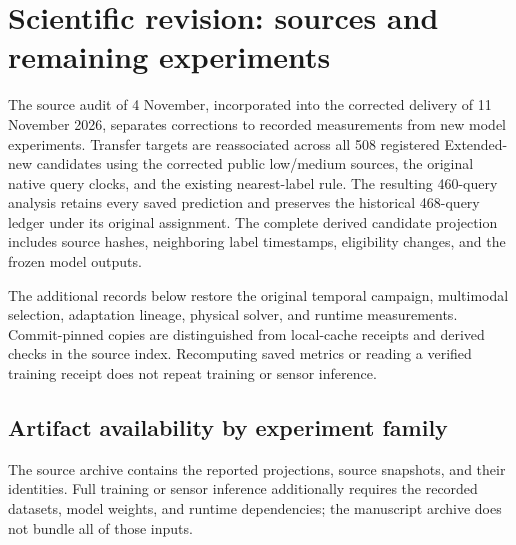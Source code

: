 \clearpage
\section{Scientific revision: sources and remaining experiments}
\label{app:scientific-revision}

The source audit of 4 November, incorporated into the corrected delivery of 11 November 2026, separates corrections to recorded measurements from new model experiments. Transfer targets are reassociated across all 508 registered Extended-new candidates using the corrected public low/medium sources, the original native query clocks, and the existing nearest-label rule. The resulting 460-query analysis retains every saved prediction and preserves the historical 468-query ledger under its original assignment. The complete derived candidate projection includes source hashes, neighboring label timestamps, eligibility changes, and the frozen model outputs. 

The additional records below restore the original temporal campaign, multimodal selection, adaptation lineage, physical solver, and runtime measurements. Commit-pinned copies are distinguished from local-cache receipts and derived checks in the source index. Recomputing saved metrics or reading a verified training receipt does not repeat training or sensor inference.



\subsection{Artifact availability by experiment family}
The source archive contains the reported projections, source snapshots, and their identities. Full training or sensor inference additionally requires the recorded datasets, model weights, and runtime dependencies; the manuscript archive does not bundle all of those inputs.

